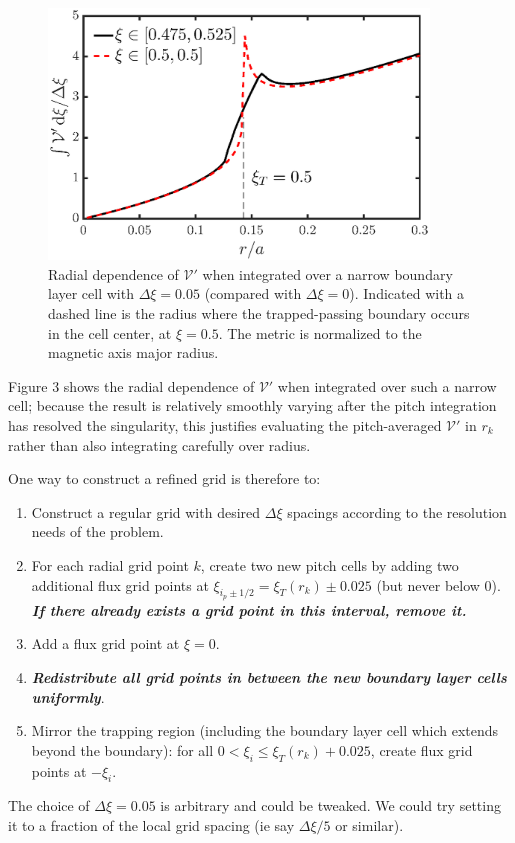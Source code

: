 \documentclass[11pt,a4paper]{article}
\begin{document}
\begin{figure}[H]
\begin{center}
\includegraphics[width=0.90\textwidth,trim=0 0 0 0]{trappedbc_IntegratedVpPlot}
\caption{Radial dependence of $\mathcal{V}'$ when integrated over a narrow boundary layer cell with $\Delta \xi=0.05$ (compared with $\Delta\xi=0$). Indicated with a dashed line is the radius where the trapped-passing boundary occurs in the cell center, at $\xi=0.5$. The metric is normalized to the magnetic axis major radius.}
\end{center}
\end{figure}


Figure 3 shows the radial dependence of $\mathcal{V}'$ when integrated over such a narrow cell; because the result is relatively smoothly varying after the pitch integration has resolved the singularity, this justifies evaluating the pitch-averaged $\mathcal{V}'$ in $r_k$ rather than also integrating carefully over radius.

One way to construct a refined grid is therefore to:
\begin{enumerate}
\item Construct a regular grid with desired $\Delta \xi$ spacings according to the resolution needs of the problem.
\item For each radial grid point $k$, create two new pitch cells by adding two additional flux grid points at $\xi_{i_p\pm1/2} = \xi_T(r_k) \pm 0.025$ (but never below 0). {\bf \emph{If there already exists a grid point in this interval, remove it.}}
\item Add a flux grid point at $\xi=0$.
\item {\bf \emph{Redistribute all grid points in between the new boundary layer cells uniformly}}.
\item Mirror the trapping region (including the boundary layer cell which extends beyond the boundary): for all $0 < \xi_i \leq \xi_T(r_k)+0.025$, create flux grid points at $-\xi_i$.
\end{enumerate}
The choice of $\Delta \xi = 0.05$ is arbitrary and could be tweaked. We could try setting it to a fraction of the local grid spacing (ie say $\Delta \xi/5$ or similar).
\end{document}
